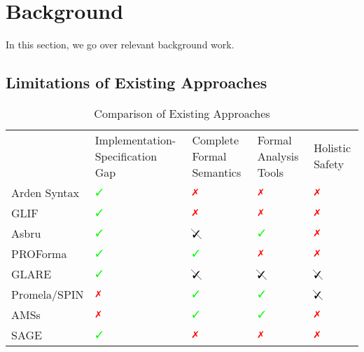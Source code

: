 \section{Background}
In this section, we go over relevant background work.

\subsection{Limitations of Existing Approaches}
\begin{center}
\renewcommand{\arraystretch}{0.5}
  \begin{table}
  \begin{tabularx}{\textwidth}{
      >{\centering\arraybackslash}X
    || >{\centering\arraybackslash}X
    | >{\centering\arraybackslash}X
    | >{\centering\arraybackslash}X
    | >{\centering\arraybackslash}X
  }
                 & Implementation-Specification Gap & Complete Formal Semantics & Formal Analysis Tools & Holistic Safety  \\
    Arden Syntax & $\greencheck$                               & $\redcross$               & $\redcross$           & $\redcross$ \\
    GLIF         & $\greencheck$                               & $\redcross$               & $\redcross$           & $\redcross$ \\
    Asbru        & $\greencheck$                               & $\cancelcheck$            & $\greencheck$         & $\redcross$ \\
    PROForma     & $\greencheck$                               & $\greencheck$             & $\redcross$           & $\redcross$ \\
    GLARE        & $\greencheck$                               & $\cancelcheck$            & $\cancelcheck$        & $\cancelcheck$ \\
    Promela/SPIN & $\redcross$                                 & $\greencheck$             & $\greencheck$         & $\cancelcheck$ \\
    AMSs         & $\redcross$                                 & $\greencheck$             & $\greencheck$         & $\redcross$ \\
    SAGE         & $\greencheck$                               & $\redcross$               & $\redcross$           & $\redcross$ \\
  \end{tabularx}
  \caption{Comparison of Existing Approaches}\label{table:existing-approaches}
  \end{table}
\end{center}

